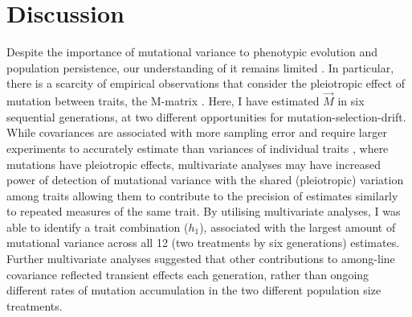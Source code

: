 \section{Discussion}
Despite the importance of mutational variance to phenotypic evolution and population persistence, our understanding of it remains limited \citep{Wals18c28}. In particular, there is a scarcity of empirical observations that consider the pleiotropic effect of mutation between traits, the M-matrix \citep{Jone07}. Here, I have estimated $\vec{M}$ in six sequential generations, at two different opportunities for mutation-selection-drift. While covariances are associated with more sampling error and require larger experiments to accurately estimate than variances of individual traits \citep{Klei74}, where mutations have pleiotropic effects, multivariate analyses may have increased power of detection of mutational variance with the shared (pleiotropic) variation among traits allowing them to contribute to the precision of estimates similarly to repeated measures of the same trait. By utilising multivariate analyses, I was able to identify a trait combination ($h_1$), associated with the largest amount of mutational variance across all 12 (two treatments by six generations) estimates. Further multivariate analyses suggested that other contributions to among-line covariance reflected transient effects each generation, rather than ongoing different rates of mutation accumulation in the two different population size treatments.\par 

